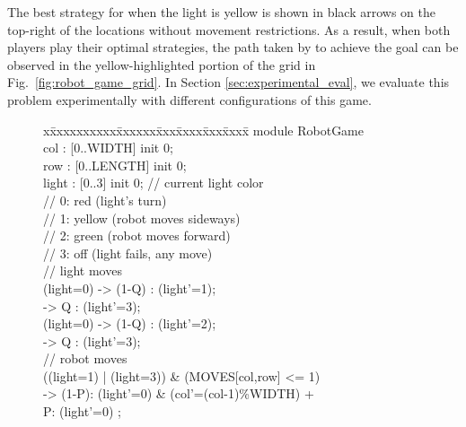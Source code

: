 	The best strategy for \roborta when the light is yellow is shown in black arrows on the top-right of the locations without movement restrictions.
	As a result, when both players play their optimal strategies, the path taken by \roborta to achieve the goal can be observed in the yellow-highlighted portion of the grid  in
Fig.~\ref{fig:robot_game_grid}.  In Section \ref{sec:experimental_eval}, we evaluate this problem experimentally with different 
configurations of this game.

\iffalse
\begin{figure}[t]
\begin{minipage}[b]{0.45\linewidth}
\fontsize{6.6}{6.6}\selectfont\ttfamily
\begin{tabbing}
x\=xxxxxxxxxx\=xxxxxx\=xxx\=xxxx\=xxx\=xxxx\= \kill    
module RobotGame\\[1ex]
\>col : [0..WIDTH] init 0; \\
\>row : [0..LENGTH] init 0; \\
\>light : [0..3] init 0; \>\>\>\> // current light color \\%
\>                   \>\>\>\>// 0: red (light's turn) \\%
\>                   \>\>\>\>// 1: yellow (robot moves sideways) \\%
\>                   \>\>\>\>// 2: green (robot moves forward) \\%
\>                   \>\>\>\>// 3: off (light fails, any move) \\[1ex]
\> // light moves \\[1ex]
\>[l\_y] (light=0) \> \>-> \>(1-Q) : (light'=1);\\
\> 					 \> \>-> \> Q : (light'=3);\\[1ex]
\>[l\_g] (light=0) \> \>-> \>(1-Q) : (light'=2);\\
\> 					 \> \>-> \> Q : (light'=3);\\[1ex]
\> // robot moves \\[1ex]
\>[r\_l]  ((light=1) | (light=3)) \& (MOVES[col,row] <= 1)  \\
\>                    \>\>-> \>(1-P): (light'=0) \& (col'=(col-1)\%WIDTH) + \\       
\>                     \>\>\>  P: (light'=0) ; \\[1ex]


\end{tabbing}
\end{minipage}
\end{figure}
